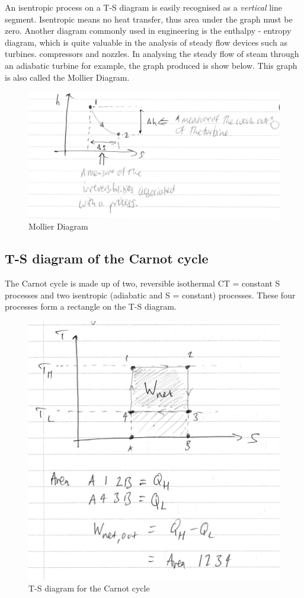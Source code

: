 \documentclass[class=report, crop=false, 12pt,a4paper]{standalone}
\numberwithin{equation}{section}
\begin{document}
An isentropic process on a T-S diagram is easily recognised as a \emph{vertical} line segment. Isentropic means no heat transfer, thus area under the graph must be zero. Another diagram commonly used in engineering is the enthalpy - entropy diagram, which is quite valuable in the analysis of steady flow devices such as turbines. compressors and nozzles. In analysing the steady flow of steam through an adiabatic turbine for example, the graph produced is show below. This graph is also called the Mollier Diagram.
\begin{figure}
  \includegraphics[width = \textwidth]{../img/MollierDiagram}
  \caption{Mollier Diagram}
\end{figure}
\subsection{T-S diagram of the Carnot cycle}
The Carnot cycle is made up of two, reversible isothermal CT = constant S processes and two isentropic (adiabatic and S = constant) processes. These four processes form a rectangle on the T-S diagram. 
\begin{figure}
  \includegraphics[width = \textwidth]{../img/TSDiagramCarnotCycle}
  \caption{T-S diagram for the Carnot cycle}
\end{figure}
\end{document}
